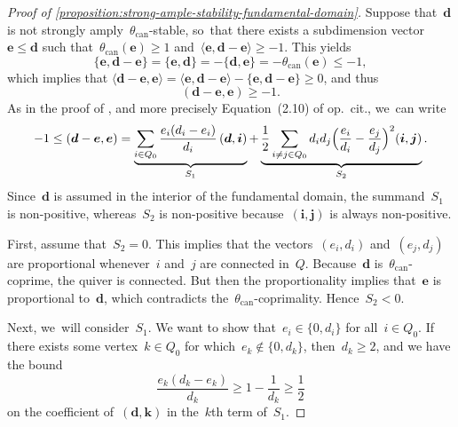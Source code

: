 \documentclass[JEP,XML,SOM,Unicode,NoEqCountersInSection,published]{cedram}
\theoremstyle{plain}
\theoremstyle{definition}
\newcommand\can{\ensuremath{\mathrm{can}}}
\newcommand\tuple[1]{\ensuremath{{\boldsymbol{#1}}}}
\begin{document}
\begin{proof}[Proof of \cref{proposition:strong-ample-stability-fundamental-domain}]
Suppose that~$\tuple{d}$ is not strongly amply~$\theta_\can$-stable, so~that
there exists a subdimension vector~$\tuple{e}\leq\tuple{d}$
such that~$\theta_\can(\tuple{e})\geq 1$
and~$\langle\tuple{e},\tuple{d}-\tuple{e}\rangle\geq-1$.
This yields
\begin{equation*}
\{\tuple{e},\tuple{d}-\tuple{e}\}
=\{\tuple{e},\tuple{d}\}
=-\{\tuple{d},\tuple{e}\}
=-\theta_\can(\tuple{e})\leq-1,
\end{equation*}
which implies that
$\langle\tuple{d}-\tuple{e},\tuple{e}\rangle
=\langle\tuple{e},\tuple{d}-\tuple{e}\rangle-\{\tuple{e},\tuple{d}-\tuple{e}\}
\geq0$,
and thus
\begin{equation*}
(\tuple{d}-\tuple{e},\tuple{e})\geq-1.
\end{equation*}
As in the proof of \cite[Lem.\,2.15]{MR0557581},
and more precisely Equation~(2.10) of op.~cit., we~can write
\begin{equation}
\label{equation:kac-inequality}
-1
\leq({\tuple{d}}-{\tuple{e}},{\tuple{e}})
=\underbrace{\sum_{i\in Q_0}\frac{e_i(d_i-e_i)}{d_i}\,({\tuple{d}},{\tuple{i}})}_{S_1}
+\underbrace{\frac{1}{2}\sum_{i\neq j\in Q_0}d_id_j\Bigl( \frac{e_i}{d_i}-\frac{e_j}{d_j} \Bigr)^2({\tuple{i}},{\tuple{j}})}_{S_2}.
\end{equation}
Since~$\tuple{d}$ is assumed in the interior of the fundamental domain,
the summand~$S_1$ is non-positive,
whereas~$S_2$ is non-positive because~$(\tuple{i},\tuple{j})$ is always non-positive.

First, assume that~$S_2=0$.
This implies that the vectors~$(e_i,d_i)$ and~$(e_j,d_j)$ are proportional
whenever~$i$ and~$j$ are connected in~$Q$.
Because~$\tuple{d}$ is~$\theta_\can$-coprime, the quiver is connected.
But then the proportionality implies that~$\tuple{e}$ is proportional to~$\tuple{d}$,
which contradicts the~$\theta_\can$-coprimality.
Hence~$S_2<0$.

Next, we~will consider~$S_1$.
We want to show that~$e_i \in \{0,d_i\}$ for all~$i\in Q_0$.
If there exists some vertex~$k\in Q_0$
for which~$e_k\not\in\{0,d_k\}$,
then~$d_k\geq 2$,
and we have the bound
\begin{equation}
\label{equation:two-inequalities}
\frac{e_k(d_k-e_k)}{d_k}\geq 1-\frac{1}{d_k}\geq\frac{1}{2}
\end{equation}
on the coefficient of~$(\tuple{d},\tuple{k})$ in the~$k$th term of~$S_1$.


\end{proof}
\end{document}
